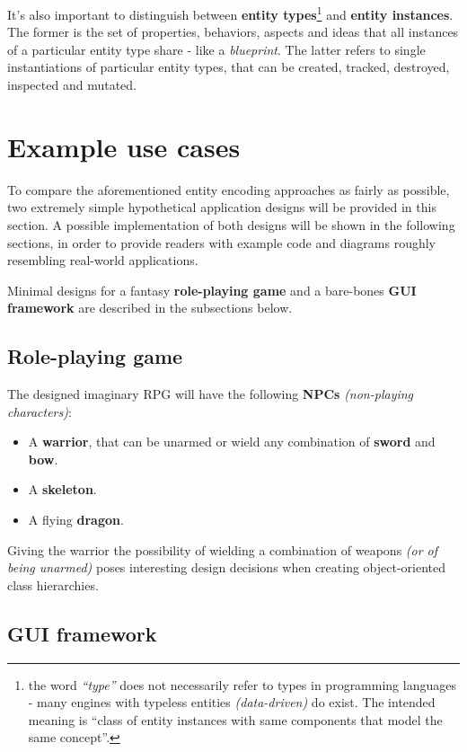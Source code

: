 \documentclass[twoside, 12pt, a4paper, openany]{book}
\begin{document}
It's also important to distinguish between \textbf{entity
types}\footnote{the word \emph{``type''} does not necessarily refer to
  types in programming languages - many engines with typeless entities
  \emph{(data-driven)} do exist. The intended meaning is ``class of
  entity instances with same components that model the same concept''.}
and \textbf{entity instances}. The former is the set of properties,
behaviors, aspects and ideas that all instances of a particular entity
type share - like a \emph{blueprint}. The latter refers to single
instantiations of particular entity types, that can be created, tracked,
destroyed, inspected and mutated.

\section{Example use cases}\label{example-use-cases}

To compare the aforementioned entity encoding approaches as fairly as
possible, two extremely simple hypothetical application designs will be
provided in this section. A possible implementation of both designs will
be shown in the following sections, in order to provide readers with
example code and diagrams roughly resembling real-world applications.

Minimal designs for a fantasy \textbf{role-playing game} and a
bare-bones \textbf{GUI framework} are described in the subsections
below.

\subsection{Role-playing game}\label{role-playing-game}

The designed imaginary RPG will have the following \textbf{NPCs}
\emph{(non-playing characters)}:

\begin{itemize}
\item
  A \textbf{warrior}, that can be unarmed or wield any combination of
  \textbf{sword} and \textbf{bow}.
\item
  A \textbf{skeleton}.
\item
  A flying \textbf{dragon}.
\end{itemize}

Giving the warrior the possibility of wielding a combination of weapons
\emph{(or of being unarmed)} poses interesting design decisions when
creating object-oriented class hierarchies.

\subsection{GUI framework}\label{gui-framework}
\end{document}
